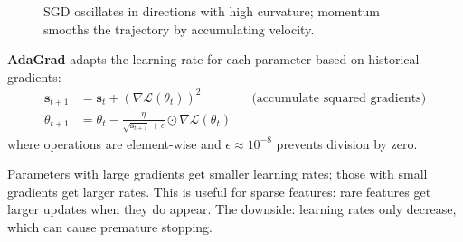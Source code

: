 \begin{figure}[h]
\centering
\caption{SGD oscillates in directions with high curvature; momentum smooths the trajectory by accumulating velocity.}
\end{figure}

\begin{definition}[AdaGrad]
    \textbf{AdaGrad} adapts the learning rate for each parameter based on historical gradients:
    \begin{align}
        \mathbf{s}_{t+1} &= \mathbf{s}_t + (\nabla \mathcal{L}(\theta_t))^2 & &\text{(accumulate squared gradients)} \\
        \theta_{t+1} &= \theta_t - \frac{\eta}{\sqrt{\mathbf{s}_{t+1}} + \epsilon} \odot \nabla \mathcal{L}(\theta_t)
    \end{align}
    where operations are element-wise and $\epsilon \approx 10^{-8}$ prevents division by zero.
\end{definition}

\begin{remark}
    Parameters with large gradients get smaller learning rates; those with small gradients get larger rates. This is useful for sparse features: rare features get larger updates when they do appear. The downside: learning rates only decrease, which can cause premature stopping.
\end{remark}

